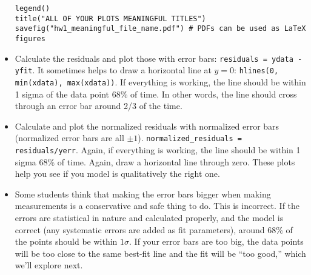 \documentclass[11pt]{hmcpset}
\begin{document}
\begin{problem}
\begin{itemize}
\begin{lstlisting}[style=Python]
legend()
title("ALL OF YOUR PLOTS MEANINGFUL TITLES")
savefig("hw1_meaningful_file_name.pdf") # PDFs can be used as LaTeX figures
\end{lstlisting}
\vspace{-1em}
		\item Calculate the residuals and plot those with error bars: \texttt{residuals = ydata - yfit}. It sometimes helps to draw a horizontal line at $y=0$: \texttt{hlines(0, min(xdata), max(xdata))}. If everything is working, the line should be within 1 sigma of the data point 68\% of time. In other words, the line should cross through an error bar around 2/3 of the time.
		\item Calculate and plot the normalized residuals with normalized error bars (normalized error bars are all $\pm1$). \texttt{normalized\_residuals = residuals/yerr}. Again, if everything is working, the line should be within 1 sigma 68\% of time. Again, draw a horizontal line through zero. These plots help you see if you model is qualitatively the right one.
		\item Some students think that making the error bars bigger when making measurements is a conservative and safe thing to do. This is incorrect. If the errors are statistical in nature and calculated properly, and the model is correct (any systematic errors are added as fit parameters), around 68\% of the points should be within $1\sigma$. If your error bars are too big, the data points will be too close to the same best-fit line and the fit will be ``too good,'' which we'll explore next.
	\end{itemize}

\end{problem}


\end{document}
